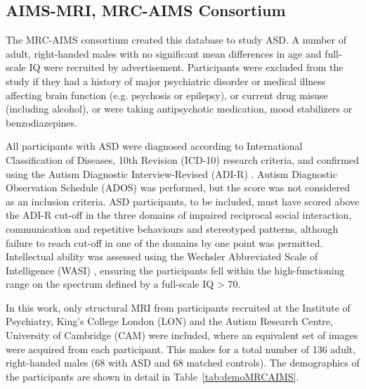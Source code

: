 \subsection{AIMS-MRI, \acs{MRC-AIMS} Consortium}\label{sec:aims-mri}
The \acs{MRC-AIMS} consortium created this database to study \ac{ASD}. A number of adult, right-handed males with no significant mean differences in age and full-scale IQ were recruited by advertisement. Participants were excluded from the study if they had a history of major psychiatric disorder or medical illness affecting brain function (e.g. psychosis or epilepsy), or current drug misuse (including alcohol), or were taking antipsychotic medication, mood stabilizers or benzodiazepines. 

All participants with \ac{ASD} were diagnosed according to International Classification of Diseases, 10th Revision (ICD-10) research criteria, and confirmed using the Autism Diagnostic Interview-Revised (ADI-R) \cite{Lord1994}. Autism Diagnostic Observation Schedule (ADOS) \cite{Lord2000} was performed, but the score was not considered as an inclusion criteria. \ac{ASD} participants, to be included, must have scored above the ADI-R cut-off in the three domains of impaired reciprocal social interaction, communication and repetitive behaviours and stereotyped patterns, although failure to reach cut-off in one of the domains by one point was permitted. Intellectual ability was assessed using the Wechsler Abbreviated Scale of Intelligence (WASI) \cite{Wechsler1999a}, ensuring the participants fell within the high-functioning range on the spectrum defined by a full-scale IQ > 70.

In this work, only structural \ac{MRI} from participants recruited at the Institute of Psychiatry, King’s College London (LON) and the Autism Research Centre, University of Cambridge (CAM) were included, where an equivalent set of images were acquired from each participant. This makes for a total number of 136 adult, right-handed males (68 with \ac{ASD} and 68 matched controls). The demographics of the participants are shown in detail in Table~\ref{tab:demoMRCAIMS}. 

